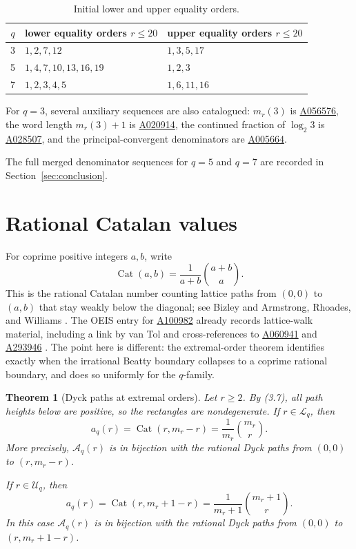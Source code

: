 \documentclass[11pt]{article}
\newtheorem{theorem}{Theorem}
\newcommand{\OEIS}[1]{\href{https://oeis.org/#1}{#1}}
\newcommand{\Aq}{\mathcal A}
\newcommand{\Lq}{\mathcal L}
\newcommand{\Uq}{\mathcal U}
\newcommand{\Cat}{\operatorname{Cat}}
\begin{document}
\begin{table}[ht]
\centering
\small
\begin{tabular}{c p{5.3cm} p{5.3cm}}
\toprule
\(q\) & lower equality orders \(r\leq20\) & upper equality orders \(r\leq20\)\\
\midrule
3 & \(1,2,7,12\) & \(1,3,5,17\)\\
5 & \(1,4,7,10,13,16,19\) & \(1,2,3\)\\
7 & \(1,2,3,4,5\) & \(1,6,11,16\)\\
\bottomrule
\end{tabular}
\caption{Initial lower and upper equality orders.}
\label{tab:records}
\end{table}

For \(q=3\), several auxiliary sequences are also catalogued:
\(m_r(3)\) is \OEIS{A056576}, the word length \(m_r(3)+1\) is
\OEIS{A020914}, the continued fraction of \(\log_2 3\) is
\OEIS{A028507}, and the principal-convergent denominators are
\OEIS{A005664}.

The full merged denominator sequences for \(q=5\) and \(q=7\) are
recorded in Section~\ref{sec:conclusion}.

\section{Rational Catalan values}
\label{sec:catalan}

For coprime positive integers \(a,b\), write
\[
 \Cat(a,b)=\frac1{a+b}\binom{a+b}{a}.
 \tag{5.1}
\]
This is the rational Catalan number counting lattice paths from
\((0,0)\) to \((a,b)\) that stay weakly below the diagonal; see Bizley
\cite{Bizley54} and Armstrong, Rhoades, and Williams \cite{ArmstrongRW13}.
The OEIS entry for \OEIS{A100982} already records lattice-walk material,
including a link by van Tol and cross-references to \OEIS{A060941} and
\OEIS{A293946} \cite{OEIS100982}. The point here is different: the
extremal-order theorem identifies exactly when the irrational Beatty
boundary collapses to a coprime rational boundary, and does so uniformly
for the \(q\)-family.

\begin{theorem}[Dyck paths at extremal orders]
\label{thm:dyck}
Let \(r\geq2\). By (3.7), all path heights below are positive, so the
rectangles are nondegenerate. If \(r\in\Lq_q\), then
\[
 a_q(r)=\Cat(r,m_r-r)
 =\frac1{m_r}\binom{m_r}{r}.
 \tag{5.2}
\]
More precisely, \(\Aq_q(r)\) is in bijection with the rational Dyck paths
from \((0,0)\) to \((r,m_r-r)\).

If \(r\in\Uq_q\), then
\[
 a_q(r)=\Cat(r,m_r+1-r)
 =\frac1{m_r+1}\binom{m_r+1}{r}.
 \tag{5.3}
\]
In this case \(\Aq_q(r)\) is in bijection with the rational Dyck paths
from \((0,0)\) to \((r,m_r+1-r)\).
\end{theorem}
\end{document}
